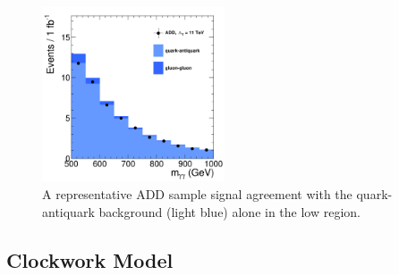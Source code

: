 
\begin{figure}[htbp!]
\caption{A representative ADD sample signal agreement with the quark-antiquark background (light blue) alone in the low \mgg region.}
\begin{center}
\includegraphics[angle=0,width=0.48\textwidth]{fig/GG_bkg_sub-1.png}
\end{center}
\label{fig:ADDsignal_and_GG}
\end{figure}




\subsection{Clockwork Model}


